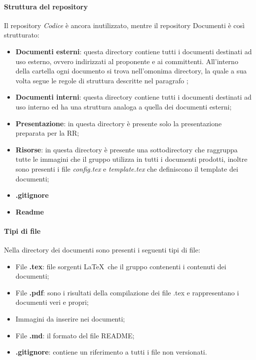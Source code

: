 \paragraph{Struttura del repository}
\label{par:struttura_repo}
Il repository \emph{Codice} è ancora inutilizzato, mentre il repository Documenti è così strutturato:
\begin{itemize}
    \item \textbf{Documenti esterni}: questa directory contiene tutti i documenti destinati ad uso esterno, ovvero 
    indirizzati al proponente e ai committenti. All'interno della cartella ogni documento si trova nell'omonima 
    directory, la quale a sua volta segue le regole di struttura descritte nel paragrafo ;
    \item \textbf{Documenti interni}: questa directory contiene tutti i documenti destinati ad uso interno ed ha una 
    struttura analoga a quella dei documenti esterni;
    \item \textbf{Presentazione}: in questa directory è presente solo la presentazione preparata per la RR;
    \item \textbf{Risorse}: in questa directory è presente una sottodirectory che raggruppa tutte le immagini che il 
    gruppo utilizza in tutti i documenti prodotti, inoltre sono presenti i file \emph{config.tex} e \emph{template.tex} 
    che definiscono il template dei documenti;
    \item \textbf{.gitignore}
    \item \textbf{Readme}
\end{itemize}

\paragraph{Tipi di file}
\label{par:tipi_file}
Nella directory dei documenti sono presenti i seguenti tipi di file:
\begin{itemize}
    \item File \textbf{.tex}: file sorgenti \LaTeX\ che il gruppo contenenti i contenuti dei documenti;
    \item File \textbf{.pdf}: sono i risultati della compilazione dei file .tex e rappresentano i documenti veri e propri;
    \item Immagini da inserire nei documenti;
    \item File \textbf{.md}: il formato del file README;
    \item \textbf{.gitignore}: contiene un riferimento a tutti i file non versionati.
\end{itemize}

